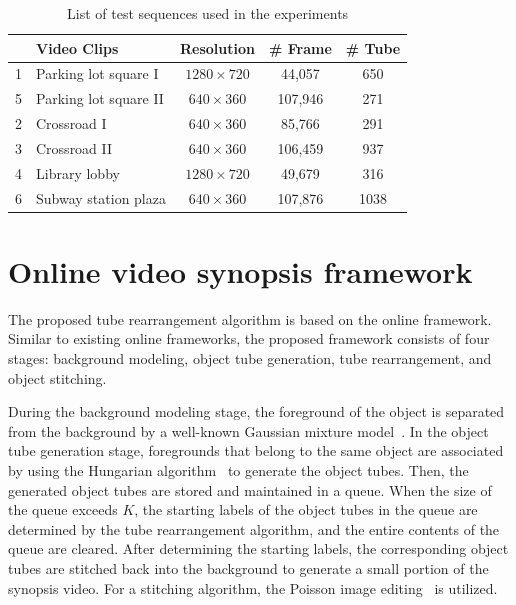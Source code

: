 \documentclass[11pt]{hyu_thesis}
\begin{document}
\begin{table}
\small
\begin{center}
\begin{tabular}{c|l|c|c|c|}
\cline{2-5}
 & Video Clips & Resolution & \# Frame & \# Tube\\
\hline
\multicolumn{1}{|c|}{1} & Parking lot square I & $1280 \times 720$ & 44,057 & 650\\
\hline
\multicolumn{1}{|c|}{5} & Parking lot square II & $640 \times 360$ & 107,946 & 271\\
\hline
\multicolumn{1}{|c|}{2} & Crossroad I & $640 \times 360$ & 85,766 & 291\\
\hline
\multicolumn{1}{|c|}{3} & Crossroad II & $640 \times 360$ & 106,459 & 937\\
\hline
\multicolumn{1}{|c|}{4} & Library lobby & $1280 \times 720$ & 49,679 & 316\\
\hline
\multicolumn{1}{|c|}{6} & Subway station plaza & $640 \times 360$ & 107,876 & 1038\\
\hline
\end{tabular}
\end{center}
\caption{List of test sequences used in the experiments}
\label{tb:video_list}
\end{table}

\section{Online video synopsis framework}
\label{sec:framework}
The proposed tube rearrangement algorithm is based on the online framework. Similar to existing online frameworks, the proposed framework consists of four stages: background modeling, object tube generation, tube rearrangement, and object stitching. 

During the background modeling stage, the foreground of the object is separated from the background by a well-known Gaussian mixture model~\cite{Zivkovic2004}. In the object tube generation stage, foregrounds that belong to the same object are associated by using the Hungarian algorithm~\cite{Kuhn1955} to generate the object tubes. Then, the generated object tubes are stored and maintained in a queue. When the size of the queue exceeds $K$, the starting labels of the object tubes in the queue are determined by the tube rearrangement algorithm, and the entire contents of the queue are cleared. After determining the starting labels, the corresponding object tubes are stitched back into the background to generate a small portion of the synopsis video. For a stitching algorithm, the Poisson image editing~\cite{Perez2003} is utilized. 
\end{document}
